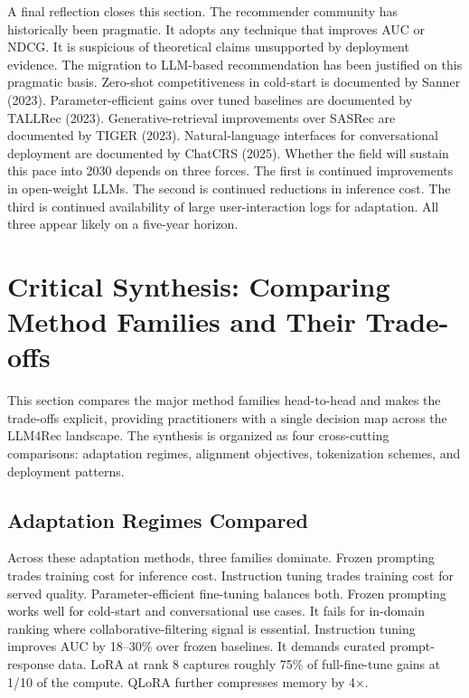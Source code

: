 A final reflection closes this section. The recommender community has historically been pragmatic. It adopts any technique that improves AUC or NDCG. It is suspicious of theoretical claims unsupported by deployment evidence. The migration to LLM-based recommendation has been justified on this pragmatic basis. Zero-shot competitiveness in cold-start is documented by Sanner (2023). Parameter-efficient gains over tuned baselines are documented by TALLRec (2023). Generative-retrieval improvements over SASRec are documented by TIGER (2023). Natural-language interfaces for conversational deployment are documented by ChatCRS (2025). Whether the field will sustain this pace into 2030 depends on three forces. The first is continued improvements in open-weight LLMs. The second is continued reductions in inference cost. The third is continued availability of large user-interaction logs for adaptation. All three appear likely on a five-year horizon.

\section{Critical Synthesis: Comparing Method Families and Their Trade-offs}\label{critical-synthesis-comparing-method-families-and-their-trade-offs}

This section compares the major method families head-to-head and makes the trade-offs explicit, providing practitioners with a single decision map across the LLM4Rec landscape. The synthesis is organized as four cross-cutting comparisons: adaptation regimes, alignment objectives, tokenization schemes, and deployment patterns.

\subsection{Adaptation Regimes Compared}\label{adaptation-regimes-compared}

Across these adaptation methods, three families dominate. Frozen prompting trades training cost for inference cost. Instruction tuning trades training cost for served quality. Parameter-efficient fine-tuning balances both. Frozen prompting works well for cold-start and conversational use cases. It fails for in-domain ranking where collaborative-filtering signal is essential. Instruction tuning improves AUC by 18--30\% over frozen baselines. It demands curated prompt-response data. LoRA at rank 8 captures roughly 75\% of full-fine-tune gains at 1/10 of the compute. QLoRA further compresses memory by 4×.

